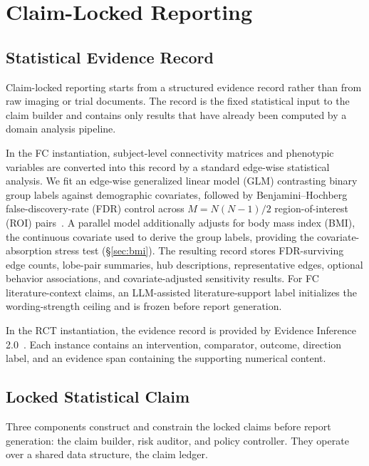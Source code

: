 \documentclass[10pt,twocolumn]{article}
\begin{document}
\section{Claim-Locked Reporting}
\label{sec:method}

\subsection{Statistical Evidence Record}

Claim-locked reporting starts from a structured evidence record rather than from raw imaging or trial documents. The record is the fixed statistical input to the claim builder and contains only results that have already been computed by a domain analysis pipeline.

In the FC instantiation, subject-level connectivity matrices and phenotypic variables are converted into this record by a standard edge-wise statistical analysis. We fit an edge-wise generalized linear model (GLM) contrasting binary group labels against demographic covariates, followed by Benjamini--Hochberg false-discovery-rate (FDR) control across $M=N(N-1)/2$ region-of-interest (ROI) pairs~\citep{ref_bh}. A parallel model additionally adjusts for body mass index (BMI), the continuous covariate used to derive the group labels, providing the covariate-absorption stress test (\S\ref{sec:bmi}). The resulting record stores FDR-surviving edge counts, lobe-pair summaries, hub descriptions, representative edges, optional behavior associations, and covariate-adjusted sensitivity results. 
For FC literature-context claims, an LLM-assisted literature-support label initializes the wording-strength ceiling and is frozen before report generation.

In the RCT instantiation, the evidence record is provided by Evidence Inference 2.0~\citep{ref_ei2}. Each instance contains an intervention, comparator, outcome, direction label, and an evidence span containing the supporting numerical content.

\subsection{Locked Statistical Claim}
\label{sec:components}

Three components construct and constrain the locked claims before report generation: the claim builder, risk auditor, and policy controller. They operate over a shared data structure, the claim ledger.
\end{document}
